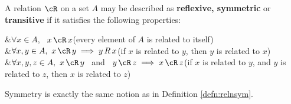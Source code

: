 \begin{defn}
A relation $\cR$ on a set $A$ may be described as \textbf{reflexive, symmetric} or \textbf{transitive} if it satisfies the following properties:
	\begin{ptabular}{\trans}
		&$\forall x\in A$, \ $x\,\cR\,x$\hfill(every element of $A$ is related to itself)\\
		\symm&$\forall x,y\in A,\ x\,\cR\,y\implies y\,R\,x$\hfill(if $x$ is related to $y$, then $y$ is related to $x$)\\
		\trans&$\forall x,y,z\in A,\ x\,\cR\,y$ \ and \ $y\,\cR\,z\implies x\,\cR\,z$\hfill(if $x$ is related to $y$, and $y$ is related to $z$,\newline
		\phantom{bob}\hfill then $x$ is related to $z$)
	\end{ptabular}
\end{defn}

Symmetry is exactly the same notion as in Definition \ref{defn:relnsym}.

